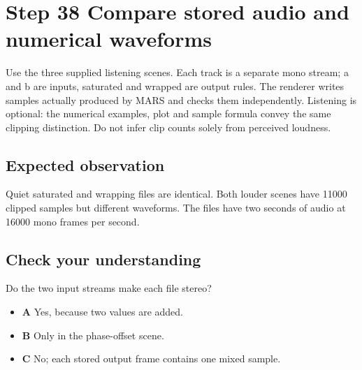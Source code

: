\section{Step 38 Compare stored audio and numerical waveforms}\label{pcm-s38}

Use the three supplied listening scenes. Each track is a separate mono stream; a and b are inputs, saturated and wrapped are output rules. The renderer writes samples actually produced by MARS and checks them independently. Listening is optional: the numerical examples, plot and sample formula convey the same clipping distinction. Do not infer clip counts solely from perceived loudness.

\subsection{Expected observation}
Quiet saturated and wrapping files are identical. Both louder scenes have 11000 clipped samples but different waveforms. The files have two seconds of audio at 16000 mono frames per second.

\subsection{Check your understanding}
Do the two input streams make each file stereo?

\begin{itemize}
  \item \textbf{A} Yes, because two values are added.
  \item \textbf{B} Only in the phase-offset scene.
  \item \textbf{C} No; each stored output frame contains one mixed sample.
\end{itemize}
